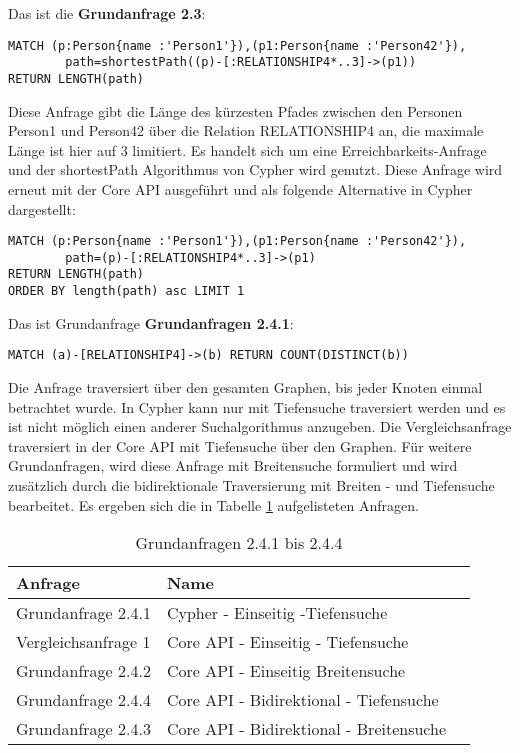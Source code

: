 Das ist die \textbf{Grundanfrage 2.3}: 
\begin{Verbatim}[frame=single]
MATCH (p:Person{name :'Person1'}),(p1:Person{name :'Person42'}),
		path=shortestPath((p)-[:RELATIONSHIP4*..3]->(p1)) 
RETURN LENGTH(path)
\end{Verbatim} 
Diese Anfrage gibt die Länge des kürzesten Pfades zwischen den Personen Person1 und Person42 über die Relation RELATIONSHIP4 an, die maximale Länge ist hier auf 3 limitiert. Es handelt sich um eine Erreichbarkeits-Anfrage und der shortestPath Algorithmus von Cypher wird genutzt. Diese Anfrage wird erneut mit der Core API ausgeführt und als folgende Alternative in Cypher dargestellt: 
\begin{Verbatim}[frame=single]
MATCH (p:Person{name :'Person1'}),(p1:Person{name :'Person42'}),
		path=(p)-[:RELATIONSHIP4*..3]->(p1) 
RETURN LENGTH(path)
ORDER BY length(path) asc LIMIT 1
\end{Verbatim}
 Das ist Grundanfrage \textbf{Grundanfragen 2.4.1}:
 \begin{Verbatim}[frame=single]
 MATCH (a)-[RELATIONSHIP4]->(b) RETURN COUNT(DISTINCT(b))
 \end{Verbatim}
Die Anfrage traversiert über den gesamten Graphen, bis jeder Knoten einmal betrachtet wurde. In Cypher kann nur mit Tiefensuche traversiert werden und es ist nicht möglich einen anderer Suchalgorithmus anzugeben. Die Vergleichsanfrage traversiert in der Core API mit Tiefensuche über den Graphen. Für weitere Grundanfragen, wird diese Anfrage mit  Breitensuche formuliert und wird zusätzlich durch die bidirektionale Traversierung mit Breiten - und Tiefensuche bearbeitet. Es ergeben sich die in  Tabelle \ref{tab:Intro_Query2_4} aufgelisteten Anfragen. 
\FloatBarrier
\begin{table}[h]
	\centering
	\begin{tabular}{ |p{5cm}||p{7cm}|p{3cm}  }
		\hline
		Anfrage& Name\\
		\hline
		Grundanfrage 2.4.1 &  Cypher - Einseitig -Tiefensuche\\
		Vergleichsanfrage 1 &  Core API - Einseitig - Tiefensuche \\
		Grundanfrage 2.4.2 &  Core API - Einseitig Breitensuche\\
		Grundanfrage 2.4.4 &  Core API -  Bidirektional - Tiefensuche\\
		Grundanfrage 2.4.3&  Core API - Bidirektional - Breitensuche\\
		\hline
	\end{tabular}
	\caption{Grundanfragen 2.4.1 bis 2.4.4}
	\label{tab:Intro_Query2_4}
\end{table}
\FloatBarrier
